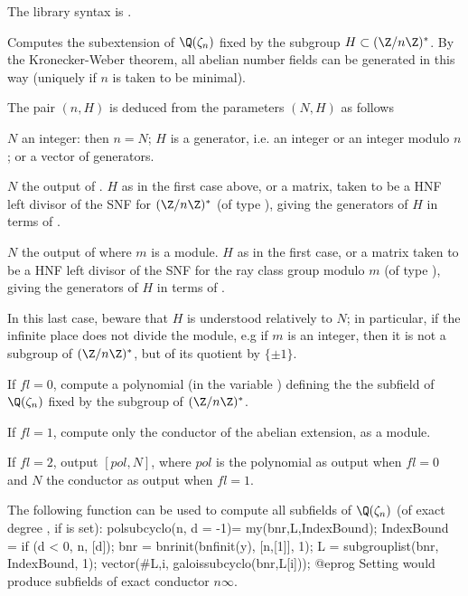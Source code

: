 The library syntax is .

\label{se:galoissubcyclo}
Computes the subextension
of $\Q(\zeta_n)$ fixed by the subgroup $H \subset (\Z/n\Z)^*$. By the
Kronecker-Weber theorem, all abelian number fields can be generated in this
way (uniquely if $n$ is taken to be minimal).

\noindent The pair $(n, H)$ is deduced from the parameters $(N, H)$ as follows

\item $N$ an integer: then $n = N$; $H$ is a generator, i.e. an
integer or an integer modulo $n$; or a vector of generators.

\item $N$ the output of . $H$ as in the first case
above, or a matrix, taken to be a HNF left divisor of the SNF for $(\Z/n\Z)^*$
(of type ), giving the generators of $H$ in terms of .

\item $N$ the output of  where $m$ is a
module. $H$ as in the first case, or a matrix taken to be a HNF left
divisor of the SNF for the ray class group modulo $m$
(of type ), giving the generators of $H$ in terms of .

In this last case, beware that $H$ is understood relatively to $N$; in
particular, if the infinite place does not divide the module, e.g if $m$ is
an integer, then it is not a subgroup of $(\Z/n\Z)^*$, but of its quotient by
$\{\pm 1\}$.

If $fl=0$, compute a polynomial (in the variable ) defining the
the subfield of $\Q(\zeta_n)$ fixed by the subgroup  of $(\Z/n\Z)^*$.

If $fl=1$, compute only the conductor of the abelian extension, as a module.

If $fl=2$, output $[pol, N]$, where $pol$ is the polynomial as output when
$fl=0$ and $N$ the conductor as output when $fl=1$.

The following function can be used to compute all subfields of
$\Q(\zeta_n)$ (of exact degree , if  is set):
\bprog
polsubcyclo(n, d = -1)=
{ my(bnr,L,IndexBound);
  IndexBound = if (d < 0, n, [d]);
  bnr = bnrinit(bnfinit(y), [n,[1]], 1);
  L = subgrouplist(bnr, IndexBound, 1);
  vector(#L,i, galoissubcyclo(bnr,L[i]));
}
@eprog\noindent
Setting  would produce subfields of exact
conductor $n\infty$.

